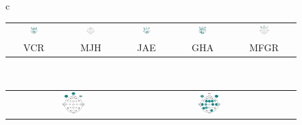 \documentclass[12pt,a4paper]{mitthesis}
\begin{document}
\begin{figure}
\centering
\begin{tabular}{c}
\begin{tabular}{ccccc}
\includegraphics[width=0.17\textwidth]{./cabecitas/cabecita_VCR.pdf} &
\includegraphics[width=0.17\textwidth]{./cabecitas/cabecita_MJH.pdf} &
\includegraphics[width=0.17\textwidth]{./cabecitas/cabecita_JAE.pdf} &
\includegraphics[width=0.17\textwidth]{./cabecitas/cabecita_GHA.pdf} &
\includegraphics[width=0.17\textwidth]{./cabecitas/cabecita_MFGR.pdf} \\
VCR & MJH & JAE & GHA & MFGR
\end{tabular}
\\
\begin{tabular}{cccc}
\includegraphics[width=0.17\textwidth]{./cabecitas/cabecita_CLO.pdf} &
\includegraphics[width=0.17\textwidth]{./cabecitas/cabecita_RLO.pdf} &

\end{tabular}
\end{tabular}
\end{figure}
\end{document}
